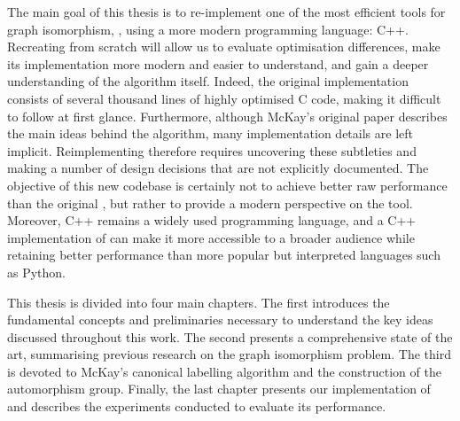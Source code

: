 The main goal of this thesis is to re-implement one of the most efficient tools for graph isomorphism, \Naut{}, using a more modern programming language: C++. Recreating \Naut{} from scratch will allow us to evaluate optimisation differences, make its implementation more modern and easier to understand, and gain a deeper understanding of the algorithm itself. Indeed, the original implementation consists of several thousand lines of highly optimised C code, making it difficult to follow at first glance. Furthermore, although McKay's original paper describes the main ideas behind the algorithm, many implementation details are left implicit. Reimplementing \Naut{} therefore requires uncovering these subtleties and making a number of design decisions that are not explicitly documented.
The objective of this new codebase is certainly not to achieve better raw performance than the original \Naut{}, but rather to provide a modern perspective on the tool. Moreover, C++ remains a widely used programming language, and a C++ implementation of \Naut{} can make it more accessible to a broader audience while retaining better performance than more popular but interpreted languages such as Python.

This thesis is divided into four main chapters. The first introduces the fundamental concepts and preliminaries necessary to understand the key ideas discussed throughout this work. The second presents a comprehensive state of the art, summarising previous research on the graph isomorphism problem. The third is devoted to McKay's canonical labelling algorithm and the construction of the automorphism group. Finally, the last chapter presents our implementation of \Naut{} and describes the experiments conducted to evaluate its performance.